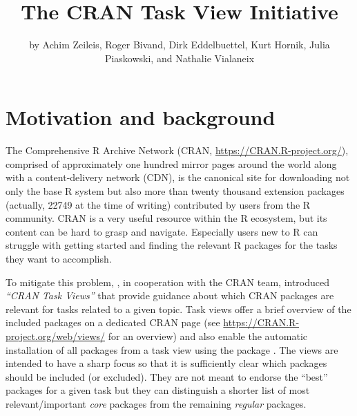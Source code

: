 \title{The CRAN Task View Initiative}


\author{by Achim Zeileis, Roger Bivand, Dirk Eddelbuettel, Kurt Hornik, Julia Piaskowski, and Nathalie Vialaneix}

\maketitle


\section{Motivation and background}\label{motivation-and-background}

The Comprehensive R Archive Network (CRAN, \url{https://CRAN.R-project.org/}), comprised
of approximately one hundred mirror pages around the world along with a content-delivery network (CDN), is the canonical site
for downloading not only the base R system \citep{r-base} but also more than twenty thousand extension packages
(actually, 22749 at the time of writing) contributed by users from
the R community. CRAN is a very useful resource within the R
ecosystem, but its content can be hard to grasp and navigate. Especially users new to R
can struggle with getting started and finding the relevant R packages for the
tasks they want to accomplish.

To mitigate this problem, \citet{ctv-intro}, in cooperation with the CRAN team, introduced
\emph{``CRAN Task Views''} that provide guidance about which CRAN packages
are relevant for tasks related to a given topic. Task views offer a brief overview of
the included packages on a dedicated CRAN page (see
\url{https://CRAN.R-project.org/web/views/} for an overview) and also enable the
automatic installation of all packages from a task view using the
 package \citep{ctv-pkg}. The views are intended to have a sharp focus so
that it is sufficiently clear which packages should be included (or excluded).
They are not meant to endorse the ``best'' packages for a given task but they can
distinguish a shorter list of most relevant/important \emph{core} packages from the
remaining \emph{regular} packages.

